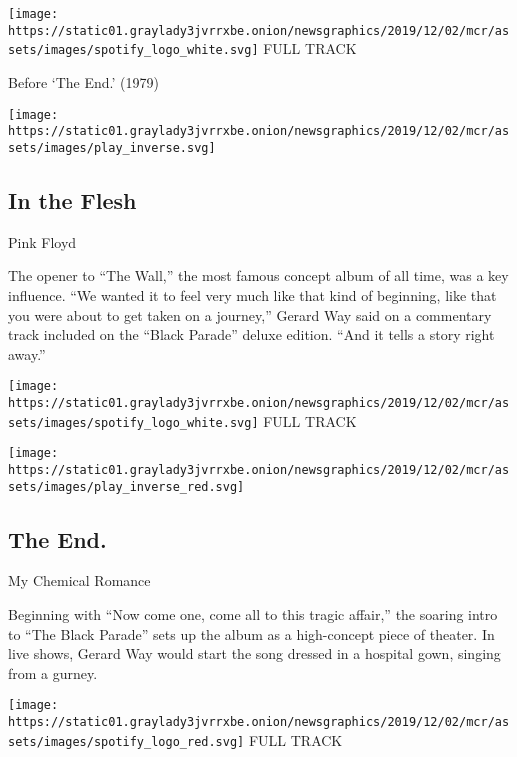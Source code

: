 \href{https://open.spotify.com/track/1JIzFhI9Lt5FyslawmHCBi?si=s35N-RhGS8688etSzn79HQ}{}

\texttt{[image: https://static01.graylady3jvrrxbe.onion/newsgraphics/2019/12/02/mcr/assets/images/spotify\_logo\_white.svg]}
FULL TRACK

Before `The End.' (1979)

\texttt{[image: https://static01.graylady3jvrrxbe.onion/newsgraphics/2019/12/02/mcr/assets/images/play\_inverse.svg]}

\hypertarget{in-the-flesh}{%
\subsection{In the Flesh}\label{in-the-flesh}}

Pink Floyd

The opener to ``The Wall,'' the most famous concept album of all time,
was a key influence. ``We wanted it to feel very much like that kind of
beginning, like that you were about to get taken on a journey,'' Gerard
Way said on a commentary track included on the ``Black Parade'' deluxe
edition. ``And it tells a story right away.''

\href{https://open.spotify.com/track/24YmWQgunJGAU8El3ndkyn?si=NPDq3CKKThiHxEF49ofyAQ}{}

\texttt{[image: https://static01.graylady3jvrrxbe.onion/newsgraphics/2019/12/02/mcr/assets/images/spotify\_logo\_white.svg]}
FULL TRACK

\texttt{[image: https://static01.graylady3jvrrxbe.onion/newsgraphics/2019/12/02/mcr/assets/images/play\_inverse\_red.svg]}

\hypertarget{the-end-1}{%
\subsection{The End.}\label{the-end-1}}

My Chemical Romance

Beginning with ``Now come one, come all to this tragic affair,'' the
soaring intro to ``The Black Parade'' sets up the album as a
high-concept piece of theater. In live shows, Gerard Way would start the
song dressed in a hospital gown, singing from a gurney.

\href{https://open.spotify.com/track/6s2yqZbiPNPL1B2IeCMsUA?si=ThPYoGEXQECd7SmPwpZSSQ}{}

\texttt{[image: https://static01.graylady3jvrrxbe.onion/newsgraphics/2019/12/02/mcr/assets/images/spotify\_logo\_red.svg]}
FULL TRACK

